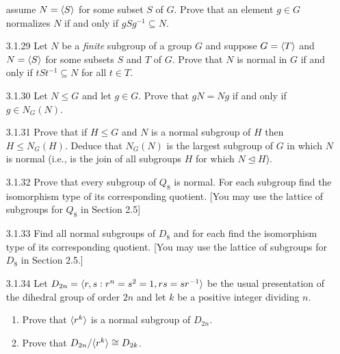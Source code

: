 \begin{enumerate}
                  assume $N = \langle S \rangle$ for some subset $S$ of $G$. Prove that an
                  element $g \in G$ normalizes $N$ if and only if
                  $gSg^{-1} \subseteq N$.
   \item[3.1.29]  Let $N$ be a \textit{finite} subgroup of a group $G$ and
                  suppose $G = \langle T \rangle$ and $N = \langle S \rangle$ for some subsets $S$
                  and $T$ of $G$. Prove that $N$ is normal in $G$ if and only if
                  $tSt^{-1} \subseteq N$ for all $t \in T$.
   \item[3.1.30]  Let $N \le G$ and let $g \in G$. Prove that $gN = Ng$ if and
                  only if $g \in N_G(N)$.
   \item[3.1.31]  Prove that if $H \le G$ and $N$ is a normal subgroup of $H$
                  then $H \le N_G(H)$. Deduce that $N_G(N)$ is the largest
                  subgroup of $G$ in which $N$ is normal (i.e., is the join of
                  all subgroups $H$ for which $N \trianglelefteq H$).
   \item[3.1.32]  Prove that every subgroup of $Q_8$ is normal. For each
                  subgroup find the isomorphism type of its corresponding
                  quotient. [You may use the lattice of subgroups for $Q_8$ in
                  Section 2.5]
   \item[3.1.33]  Find all normal subgroups of $D_8$ and for each find the
                  isomorphism type of its corresponding quotient. [You may use
                  the lattice of subgroups for $D_8$ in Section 2.5.]
   \item[3.1.34]  Let $D_{2n} = \langle r, s : r^n = s^2 = 1, rs = sr^{-1} \rangle$ be the
                  usual presentation of the dihedral group of order $2n$ and let
                  $k$ be a positive integer dividing $n$.
                  \begin{enumerate}
                     \item Prove that $\langle r^k \rangle$ is a normal subgroup of
                           $D_{2n}$.
                     \item Prove that $D_{2n}/\langle r^k \rangle \cong D_{2k}$.

\end{enumerate}
\end{enumerate}
